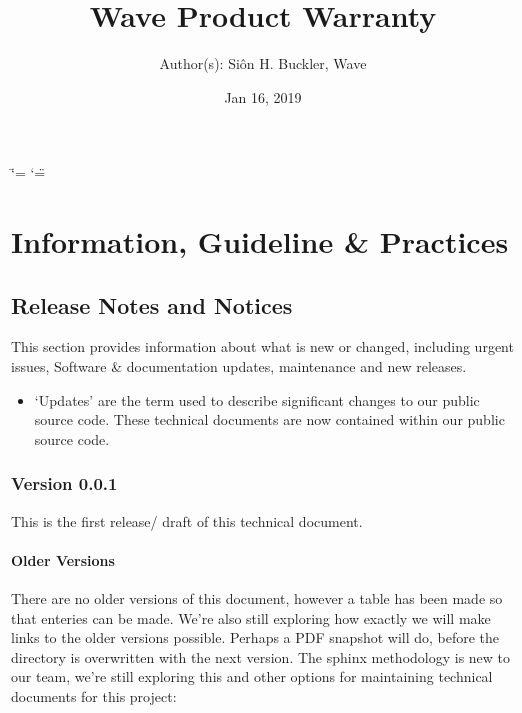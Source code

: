 \documentclass[letterpaper,10pt,english]{sphinxmanual}
\title{Wave Product Warranty}
\date{Jan 16, 2019}
\author{Author(s): Siôn H. Buckler, Wave}
\begin{document}
\ifdefined\shorthandoff
  \ifnum\catcode`\=\string=\active\shorthandoff{=}\fi
  \ifnum\catcode`\"=\active{}\fi
\fi
\maketitle
\sphinxtableofcontents
{}\label{\detokenize{index::doc}}



\chapter{Information, Guideline \& Practices}
\label{\detokenize{index:information-guideline-practices}}

\section{Release Notes and Notices}
\label{\detokenize{releasenotes:release-notes-and-notices}}\label{\detokenize{releasenotes::doc}}
This section provides information about what is new or changed, including urgent issues, Software \& documentation updates, maintenance and new releases.
\begin{itemize}
\item {} 
‘Updates’ are the term used to describe significant changes to our public source code. These technical documents are now contained within our public source code.

\end{itemize}


\subsection{Version 0.0.1}
\label{\detokenize{releasenotes:version-0-0-1}}
This is the first release/ draft of this technical document.


\subsubsection{Older Versions}
\label{\detokenize{releasenotes:older-versions}}
There are no older versions of this document, however a table has been made so that enteries can be made. We’re also still exploring how exactly we will make links to the older versions possible. Perhaps a PDF snapshot will do, before the directory is overwritten with the next version. The sphinx methodology is new to our team, we’re still exploring this and other options for maintaining technical documents for this project:
\end{document}
